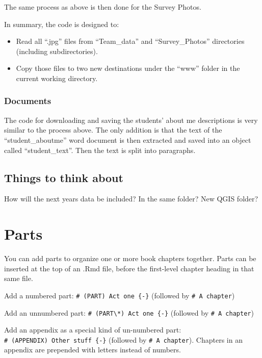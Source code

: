 \documentclass[
]{book}
\providecommand{\tightlist}{%
  \setlength{\itemsep}{0pt}\setlength{\parskip}{0pt}}
\theoremstyle{definition}
\theoremstyle{definition}
\theoremstyle{definition}
\theoremstyle{definition}
\theoremstyle{remark}
\begin{document}
The same process as above is then done for the Survey Photos.

In summary, the code is designed to:

\begin{itemize}
\tightlist
\item
  Read all ``.jpg'' files from ``Team\_data'' and ``Survey\_Photos'' directories (including subdirectories).
\item
  Copy those files to two new destinations under the ``www'' folder in the current working directory.
\end{itemize}

\hypertarget{documents}{%
\subsection{Documents}\label{documents}}

The code for downloading and saving the students' about me descriptions is very similar to the process above. The only addition is that the text of the ``student\_aboutme'' word document is then extracted and saved into an object called ``student\_text''. Then the text is split into paragraphs.

\hypertarget{things-to-think-about}{%
\section{Things to think about}\label{things-to-think-about}}

How will the next years data be included? In the same folder? New QGIS folder?

\hypertarget{parts}{%
\chapter{Parts}\label{parts}}

You can add parts to organize one or more book chapters together. Parts can be inserted at the top of an .Rmd file, before the first-level chapter heading in that same file.

Add a numbered part: \texttt{\#\ (PART)\ Act\ one\ \{-\}} (followed by \texttt{\#\ A\ chapter})

Add an unnumbered part: \texttt{\#\ (PART\textbackslash{}*)\ Act\ one\ \{-\}} (followed by \texttt{\#\ A\ chapter})

Add an appendix as a special kind of un-numbered part: \texttt{\#\ (APPENDIX)\ Other\ stuff\ \{-\}} (followed by \texttt{\#\ A\ chapter}). Chapters in an appendix are prepended with letters instead of numbers.
\end{document}
